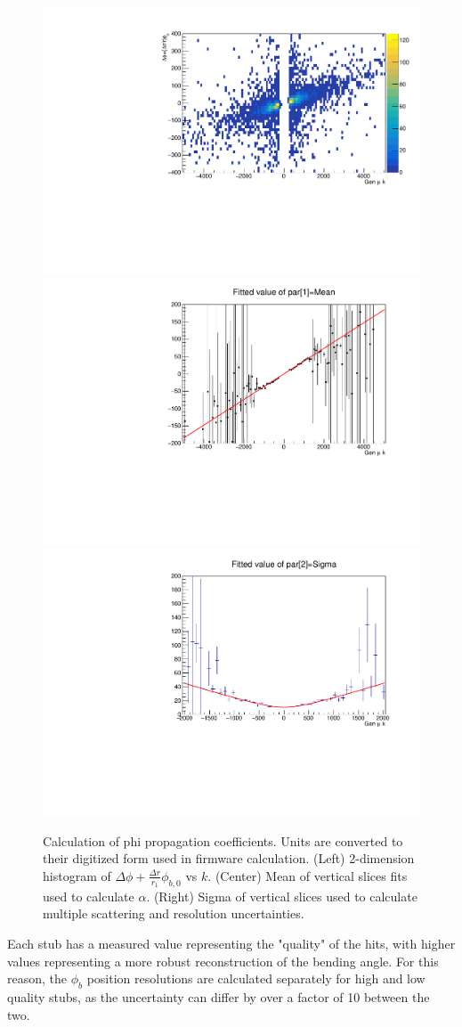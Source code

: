 \begin{figure}[htb!]
	\centering
	\includegraphics[width=0.32\linewidth]{figs/04_muons/phiprop_2d.pdf}
	\includegraphics[width=0.32\linewidth]{figs/04_muons/phiprop_mean.pdf}
	\includegraphics[width=0.32\linewidth]{figs/04_muons/phiprop_sigma.pdf}
	\caption[Calculation of phi propagation coefficients. Units are converted to their digitized form used in firmware calculation. (Left) 2-dimension histogram of $\Delta\phi+\frac{\Delta r}{r_1}\phi_{b,0}$ vs $k$. (Center) Mean of vertical slices fits used to calculate $\alpha$. (Right) Sigma of vertical slices used to calculate multiple scattering and resolution uncertainties.]
	{Calculation of phi propagation coefficients. Units are converted to their digitized form used in firmware calculation. (Left) 2-dimension histogram of $\Delta\phi+\frac{\Delta r}{r_1}\phi_{b,0}$ vs $k$. (Center) Mean of vertical slices fits used to calculate $\alpha$. (Right) Sigma of vertical slices used to calculate multiple scattering and resolution uncertainties.}
	\label{fig:phi_prop}
\end{figure}

Each stub has a measured value representing the "quality" of the hits, with higher values representing a more robust reconstruction of the bending angle. For this reason, the $\phi_b$ position resolutions are calculated separately for high and low quality stubs, as the uncertainty can differ by over a factor of 10 between the two. 

